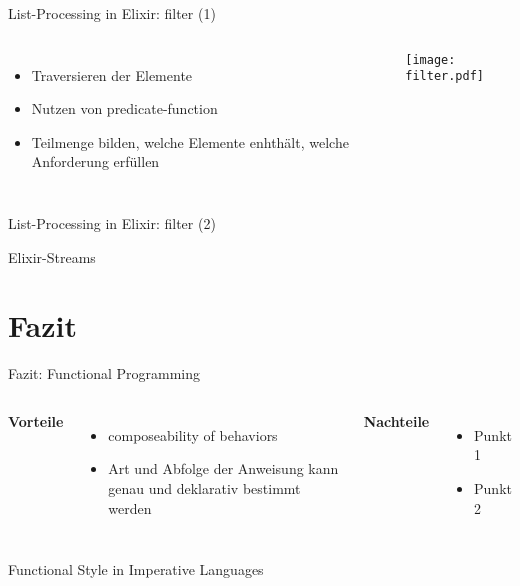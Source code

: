 \documentclass[compress]{beamer}
\begin{document}
  \begin{frame}{List-Processing in Elixir: filter (1)}
    \begin{columns}[c]
      \begin{itemize}
        \item Traversieren der Elemente
        \item Nutzen von predicate-function
        \item Teilmenge bilden, welche Elemente enhthält, welche Anforderung erfüllen
      \end{itemize}
    \texttt{[image: filter.pdf]}
    \end{columns}
  \end{frame}

  \begin{frame}{List-Processing in Elixir: filter (2)}
  \end{frame}

  \begin{frame}{Elixir-Streams}
  \end{frame}

\section{Fazit}
  \begin{frame}{Fazit: Functional Programming}
    \begin{columns}[c]
      \textbf{Vorteile}
      \begin{itemize}
        \item composeability of behaviors
        \item Art und Abfolge der Anweisung kann genau und deklarativ bestimmt werden
      \end{itemize}
      \textbf{Nachteile}
      \begin{itemize}
        \item Punkt 1
        \item Punkt 2
      \end{itemize}
    \end{columns}
  \end{frame}
  
  \begin{frame}{Functional Style in Imperative Languages}
  \end{frame}
\end{document}
